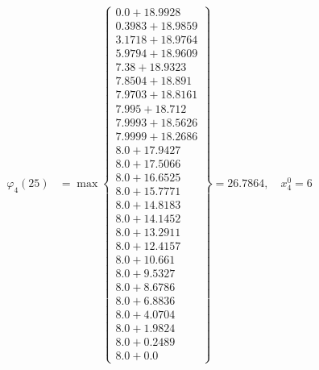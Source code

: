 \documentclass{article}
\begin{document}
\begin{align*}
  
\varphi_{4}(25) &= \max \left\{ \begin{array}{c}
0.0 + 18.9928 \\
 0.3983 + 18.9859 \\
 3.1718 + 18.9764 \\
 5.9794 + 18.9609 \\
 7.38 + 18.9323 \\
 7.8504 + 18.891 \\
 7.9703 + 18.8161 \\
 7.995 + 18.712 \\
 7.9993 + 18.5626 \\
 7.9999 + 18.2686 \\
 8.0 + 17.9427 \\
 8.0 + 17.5066 \\
 8.0 + 16.6525 \\
 8.0 + 15.7771 \\
 8.0 + 14.8183 \\
 8.0 + 14.1452 \\
 8.0 + 13.2911 \\
 8.0 + 12.4157 \\
 8.0 + 10.661 \\
 8.0 + 9.5327 \\
 8.0 + 8.6786 \\
 8.0 + 6.8836 \\
 8.0 + 4.0704 \\
 8.0 + 1.9824 \\
 8.0 + 0.2489 \\
 8.0 + 0.0
\end{array} \right\}=26.7864,\quad x_{4}^0=6\\
  
  
  

\end{align*}
\end{document}
